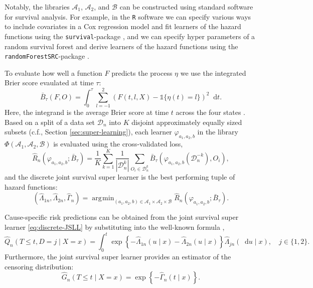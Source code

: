 \documentclass[alpha-refs]{wiley-article}
\renewcommand{\phi}{\varphi}
\newcommand*\diff{\mathop{}\!\mathrm{d}}
\newcommand{\1}{\mathds{1}}
\DeclareMathOperator*{\argmin}{\arg\!\min}
\newcommand{\data}{\ensuremath{\mathcal{D}}}
\begin{document}
  Notably, the libraries \( \mathcal{A}_1 \), \(
\mathcal{A}_2 \), and \( \mathcal{B} \) can be constructed using
standard software for survival analysis.  For example, in the
\texttt{R} software we can specify various ways to include covariates
in a Cox regression model and fit learners of the hazard functions
using the \texttt{survival}-package \citep{survival-package}, and we
can specify hyper parameters of a random survival forest and derive
learners of the hazard functions using the
\texttt{randomForestSRC}-package \citep{randomForestSRC}.

To evaluate how well a function \( F \) predicts the
process $\eta$ we use the integrated Brier score \citep{graf1999assessment}
evaulated at time \(\tau\):
\begin{equation*}
  \bar B_\tau(F,O) = \int_0^{\tau} \sum_{l=-1}^{2}
  \left(
      F(t,l,X) - \1{\{\eta(t)=l\}}
  \right)^2\diff t.
\end{equation*}
Here, the integrand is the average Brier score at time \(t\) across
the four states \citep{brier1950verification}. Based on a split of a
data set \(\data_n\) into $K$ disjoint approximately equally sized
subsets (c.f., Section \ref{sec:super-learning}), each learner \(
\phi_{a_1, a_2, b} \) in the library \( \Phi(\mathcal{A}_1,
\mathcal{A}_2, \mathcal{B}) \) is evaluated using the cross-validated
loss,
\begin{equation*}
  \hat{R}_{n}(\phi_{a_1,a_2,b} ; \bar{B}_{\tau}) =
  \frac{1}{K}\sum_{k=1}^{K}
  \frac{1}{| \data_n^{k} |}\sum_{O_i \in \data_n^{k}}
  \bar B_\tau
  {
    \left(
      \phi_{a_1,a_2,b}{ (\data_n^{-k})}
      , O_i
    \right)
  },
\end{equation*}
and the discrete joint survival super learner is the best performing tuple of hazard functions:
\begin{equation}\label{eq:discrete-JSLL}
  (\hat \Lambda_{1n},\hat \Lambda_{2n}, \hat \Gamma_{n})
  =  \argmin_{(a_1,a_2,b)\in \mathcal{A}_1\times\mathcal{A}_2\times\mathcal{B}}
    \hat{R}_{n}(\phi_{a_1,a_2,b} ; \bar{B}_{\tau}).
\end{equation}
  
Cause-specific risk predictions can be obtained from
the joint survival super learner \eqref{eq:discrete-JSLL} by
substituting into the well-known formula
\citep[e.g.,][]{benichou1990estimates, ozenne2017riskregression},
\begin{equation}
  \label{eq:cs-risk-def} \hat Q_n(T \leq t, D = j \mid X=x) = \int_0^t
\exp\left\{-\hat\Lambda_{1n}(u \mid x)-\hat\Lambda_{2n}(u \mid
x)\right\} \hat\Lambda_{jn}(\diff u \mid x), \quad j \in \{1,2\}.
\end{equation} Furthermore, the joint survival super learner provides an
estimator of the censoring distribution:
\begin{equation*}
 \hat G_n(T \leq t \mid X=x) = \exp\left\{-\hat\Gamma_n(t \mid x)\right\}.
\end{equation*}
\end{document}
